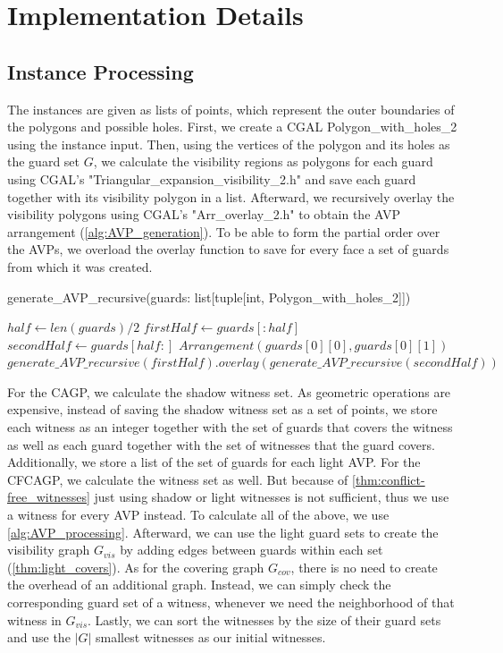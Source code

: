 \chapter{Implementation Details}

\section{Instance Processing}
The instances are given as lists of points, which represent the outer boundaries of the polygons and possible holes. First, we create a CGAL Polygon\_with\_holes\_2 using the instance input. Then, using the vertices of the polygon and its holes as the guard set $G$, we calculate the visibility regions as polygons for each guard using CGAL's "Triangular\_expansion\_visibility\_2.h" and save each guard together with its visibility polygon in a list. Afterward, we recursively overlay the visibility polygons using CGAL's "Arr\_overlay\_2.h" to obtain the AVP arrangement (\cref{alg:AVP_generation}). To be able to form the partial order over the AVPs, we overload the overlay function to save for every face a set of guards from which it was created. 

\begin{algorithm}
\caption{generate\_AVP\_recursive(guards: list[tuple[int, Polygon\_with\_holes\_2]])}\label{alg:AVP_generation}
\begin{algorithmic} 
\State $half\gets len(guards)/2$
\State $firstHalf\gets guards[:half]$ 
\State $secondHalf\gets guards[half:]$
    \State $Arrangement(guards[0][0], guards[0][1])$
\Else
    \State $generate\_AVP\_recursive(firstHalf).overlay(generate\_AVP\_recursive(secondHalf))$
\EndIf
\end{algorithmic}
\end{algorithm}

For the CAGP, we calculate the shadow witness set. As geometric operations are expensive, instead of saving the shadow witness set as a set of points, we store each witness as an integer together with the set of guards that covers the witness as well as each guard together with the set of witnesses that the guard covers. Additionally, we store a list of the set of guards for each light AVP. For the CFCAGP, we calculate the witness set as well. But because of \cref{thm:conflict-free_witnesses} just using shadow or light witnesses is not sufficient, thus we use a witness for every AVP instead. To calculate all of the above, we use \cref{alg:AVP_processing}. Afterward, we can use the light guard sets to create the visibility graph $G_{vis}$ by adding edges between guards within each set (\cref{thm:light_covers}). As for the covering graph $G_{cov}$, there is no need to create the overhead of an additional graph. Instead, we can simply check the corresponding guard set of a witness, whenever we need the neighborhood of that witness in $G_{vis}$. Lastly, we can sort the witnesses by the size of their guard sets and use the $|G|$ smallest witnesses as our initial witnesses.

